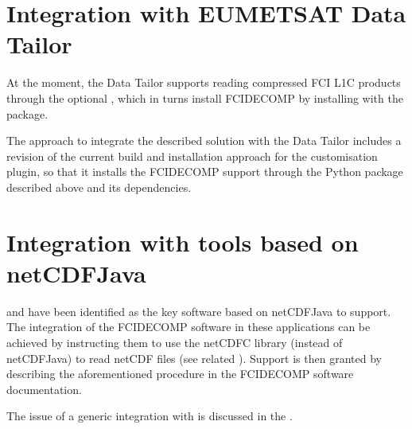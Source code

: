 \documentclass[a4paper,10pt,english]{sphinxmanual}
\begin{document}
\section{Integration with EUMETSAT Data Tailor}
\label{\detokenize{support_to_usage_patterns:integration-with-eumetsat-data-tailor}}
\sphinxAtStartPar
At the moment, the Data Tailor supports reading compressed FCI L1C products through the optional
 {\hyperref[\detokenize{introduction:mtg4africa}]{}}, which in turns install FCIDECOMP by installing
with  the  package.

\sphinxAtStartPar
The approach to integrate the described solution with the Data Tailor includes a revision of the current
build and installation approach for the  customisation plugin, so that it
installs the FCIDECOMP support through the Python package described above and its dependencies.


\section{Integration with tools based on netCDF\sphinxhyphen{}Java}
\label{\detokenize{support_to_usage_patterns:integration-with-tools-based-on-netcdf-java}}
\sphinxAtStartPar
{\hyperref[\detokenize{introduction:panoply}]{}} and {\hyperref[\detokenize{introduction:hdfview}]{}} have been identified as the key software based on netCDF\sphinxhyphen{}Java
to support. The integration of the FCIDECOMP software in these applications can be achieved by instructing them
to use the netCDF\sphinxhyphen{}C library (instead of netCDF\sphinxhyphen{}Java) to read netCDF files
(see related {\hyperref[\detokenize{introduction:netcdf-java-github}]{}}). Support is then granted by describing the aforementioned
procedure in the FCIDECOMP software documentation.

\sphinxAtStartPar
The issue of a generic integration with {\hyperref[\detokenize{introduction:netcdf-java}]{}} is discussed in the
{\hyperref[\detokenize{a_design_justifications:design-justifications}]{}}.
\end{document}
